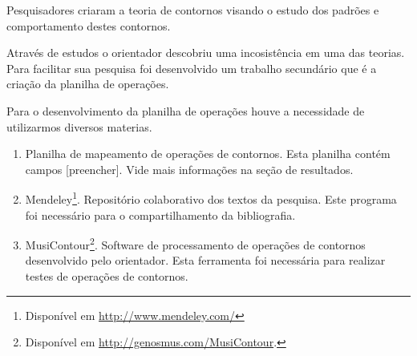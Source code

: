 \documentclass[11pt]{article}
\begin{document}
Pesquisadores criaram a teoria de contornos visando o estudo dos padrões e
comportamento destes contornos.




Através de estudos o orientador descobriu uma incosistência em uma das teorias.
Para facilitar sua pesquisa foi desenvolvido um trabalho secundário que é a
criação da planilha de operações.


\label{sec:materiais}

Para o desenvolvimento da planilha de operações houve a necessidade de
utilizarmos diversos materias.


\begin{enumerate}
\item Planilha de mapeamento de operações de contornos. Esta planilha
  contém campos [preencher]. Vide mais informações na seção de
  resultados.
\item Mendeley\footnote{Disponível em
    \url{http://www.mendeley.com/}}. Repositório colaborativo dos
  textos da pesquisa. Este programa foi necessário para o
  compartilhamento da bibliografia.
\item MusiContour\footnote{Disponível em
    \url{http://genosmus.com/MusiContour}.}. Software de processamento
  de operações de contornos desenvolvido pelo orientador. Esta
  ferramenta foi necessária para realizar testes de operações de
  contornos.
\end{enumerate}
\end{document}
